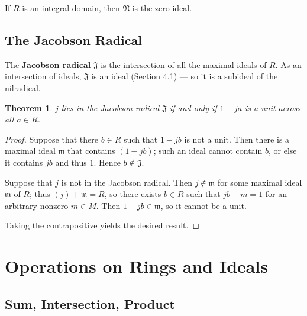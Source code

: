 \documentclass[11pt]{article}
\newtheorem{theorem}{Theorem}
\begin{document}
If $R$ is an integral domain, then $\mathfrak{N}$ is the zero ideal. 

\newpage


\subsection{The Jacobson Radical}

The \textbf{Jacobson radical} $\mathfrak{J}$ is the intersection of all the maximal ideals of $R$. As an intersection of ideals, $\mathfrak{J}$ is an ideal (Section 4.1) --- so it is a subideal of the nilradical.

\begin{adjustwidth}{0.5cm}{}
	\begin{theorem}
		$j$ lies in the Jacobson radical $\mathfrak{J}$ if and only if $1 - ja$ is a unit across all $a \in R$.
	\end{theorem}
	\begin{proof}
		Suppose that there $b \in R$ such that $1 - jb$ is not a unit. Then there is a maximal ideal $\mathfrak{m}$ that contains $(1 - jb)$; such an ideal cannot contain $b$, or else it contains $jb$ and thus $1$. Hence $b \notin \mathfrak{J}$.
		
		Suppose that $j$ is not in the Jacobson radical. Then $j \notin \mathfrak{m}$ for some maximal ideal $\mathfrak{m}$ of $R$; thus $(j) + \mathfrak{m} = R$, so there exists $b \in R$ such that $jb + m = 1$ for an arbitrary nonzero $m \in M$. Then $1 - jb \in \mathfrak{m}$, so it cannot be a unit.

		Taking the contrapositive yields the desired result.
	\end{proof}
\end{adjustwidth}


\section{Operations on Rings and Ideals}


\subsection{Sum, Intersection, Product}
\end{document}
